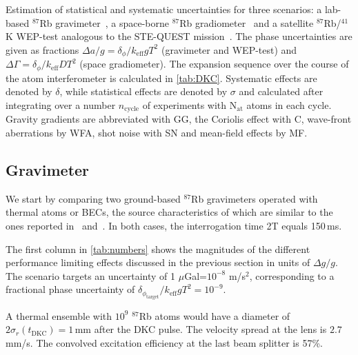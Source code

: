 \begin{center}
    \begin{table}[h!]
    \caption{Estimation of statistical and systematic uncertainties for three scenarios: a lab-based $^{87}$Rb gravimeter~\cite{LouchetChauvet2011}, a space-borne $^{87}$Rb gradiometer~\cite{Trimeche2019} and a satellite $^{87}$Rb/$^{41}$K WEP-test analogous to the STE-QUEST mission~\cite{Aguilera2014}. The phase uncertainties are given as fractions $\Delta a/g=\delta_\phi/k_\text{eff}gT^2$ (gravimeter and WEP-test) and $\Delta \Gamma=\delta_\phi/k_\text{eff}DT^2$ (space gradiometer). The expansion sequence over the course of the atom interferometer is calculated in \autoref{tab:DKC}. Systematic effects are denoted by $\delta$, while statistical effects are denoted by $\sigma$ and calculated after integrating over a number $n_\text{cycle}$ of experiments with N$_\text{at}$ atoms in each cycle. Gravity gradients are abbreviated with GG, the Coriolis effect with C, wave-front aberrations by WFA, shot noise with SN and mean-field effects by MF.}
    \centering
    \begin{footnotesize}
    
    \end{footnotesize}
    \label{tab:numbers}
    \end{table}
\end{center}

\subsection{Gravimeter}
We start by comparing two ground-based $^{87}$Rb gravimeters operated with thermal atoms or BECs, the source characteristics of which are similar to the ones reported in~\cite{LouchetChauvet2011} and~\cite{Albers2020,Rudolph2015}. In both cases, the interrogation time 2T equals 150\,ms.

The first column in \autoref{tab:numbers} shows the magnitudes of the different performance limiting effects discussed in the previous section in units of $\Delta g/g$. The scenario targets an uncertainty of 1 $\mu$Gal=$10^{-8}$ m/s$^2$, corresponding to a fractional phase uncertainty of $\delta_{\phi_\text{target}}/k_\text{eff}gT^2=10^{-9}$. 

A thermal ensemble with $10^9$ $^{87}$Rb atoms would have a diameter of $2\sigma_r(t_\text{DKC})=1$\,mm after the DKC pulse. The velocity spread at the lens is $2.7$\,mm/s. The convolved excitation efficiency at the last beam splitter is 57\%. 


